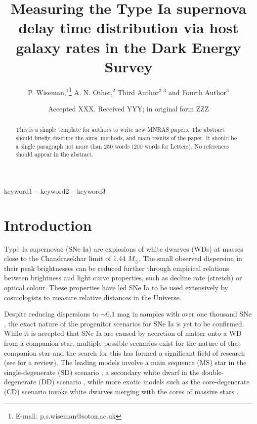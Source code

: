 \documentclass[fleqn,usenatbib]{mnras}
\title[Rates of SNe Ia in DES]{Measuring the Type Ia supernova delay time distribution via host galaxy rates in the Dark Energy Survey}
\author[P. Wiseman et al.]{
P. Wiseman,$^{1}$\thanks{E-mail: p.s.wiseman@soton.ac.uk}
A. N. Other,$^{2}$
Third Author$^{2,3}$
and Fourth Author$^{3}$
\\
}
\date{Accepted XXX. Received YYY; in original form ZZZ}
\begin{document}
\label{firstpage}
\pagerange{\pageref{firstpage}--\pageref{lastpage}}
\maketitle

\begin{abstract}
This is a simple template for authors to write new MNRAS papers.
The abstract should briefly describe the aims, methods, and main results of the paper.
It should be a single paragraph not more than 250 words (200 words for Letters).
No references should appear in the abstract.
\end{abstract}

\begin{keywords}
keyword1 -- keyword2 -- keyword3
\end{keywords}



\section{Introduction}

Type Ia supernovae (SNe Ia) are explosions of white dwarves (WDs) at masses close to the Chandrasekhar limit of 1.44 $M_{\odot}$. The small observed dispersion in their peak brightnesses can be reduced further through empirical relations between brightness and light curve properties, such as decline rate (stretch) or optical colour. These properties have led SNe Ia to be used extensively by cosmologists to measure relative distances in the Universe.

Despite reducing dispersions to $\sim 0.1$ mag in samples with over one thousand SNe \citep{Scolnic2018}, the exact nature of the progenitor scenarios for SNe Ia is yet to be confirmed. While it is accepted that SNe Ia are caused by accretion of matter onto a WD from a companion star, multiple possible scenarios exist for the nature of that companion star and the search for this has formed a significant field of research (see \citealt{Maoz2014} for a review). The leading models involve a main sequence (MS) star in the single-degenerate (SD) scenario \citep{Whelan1973,Nomoto1982}, a secondary white dwarf in the double-degenerate (DD) scenario \citep{Tutukov1976,Iben1984,Webbink1984}, while more exotic models such as the core-degenerate (CD) scenario invoke white dwarves merging with the cores of massive stars \citep{Soker2019}. 
\end{document}
